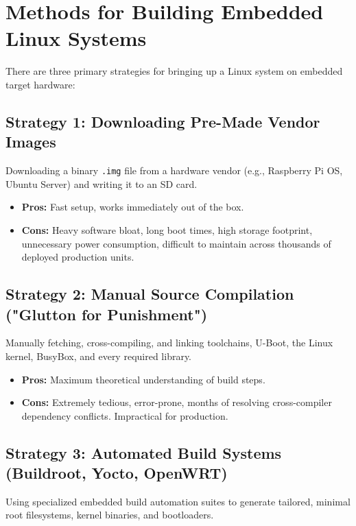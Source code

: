 \section{Methods for Building Embedded Linux Systems}

There are three primary strategies for bringing up a Linux system on embedded target hardware:

\subsection{Strategy 1: Downloading Pre-Made Vendor Images}
Downloading a binary \texttt{.img} file from a hardware vendor (e.g., Raspberry Pi OS, Ubuntu Server) and writing it to an SD card.
\begin{itemize}[leftmargin=*]
    \item \textbf{Pros:} Fast setup, works immediately out of the box.
    \item \textbf{Cons:} Heavy software bloat, long boot times, high storage footprint, unnecessary power consumption, difficult to maintain across thousands of deployed production units.
\end{itemize}

\subsection{Strategy 2: Manual Source Compilation ("Glutton for Punishment")}
Manually fetching, cross-compiling, and linking toolchains, U-Boot, the Linux kernel, BusyBox, and every required library.
\begin{itemize}[leftmargin=*]
    \item \textbf{Pros:} Maximum theoretical understanding of build steps.
    \item \textbf{Cons:} Extremely tedious, error-prone, months of resolving cross-compiler dependency conflicts. Impractical for production.
\end{itemize}

\subsection{Strategy 3: Automated Build Systems (Buildroot, Yocto, OpenWRT)}
Using specialized embedded build automation suites to generate tailored, minimal root filesystems, kernel binaries, and bootloaders.

